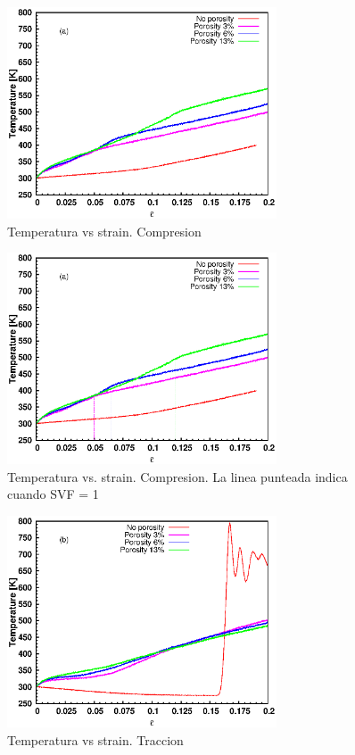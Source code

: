\documentclass[10pt, oneside]{article} %
\begin{document}

\begin{figure}[H]
\centering
\includegraphics[width=8cm]{Figures/Porosidad/porosity_temp_strain_comp.eps}
\caption{Temperatura vs strain. Compresion}
\end{figure}

\begin{figure}[H]
\centering
\includegraphics[width=8cm]{Figures/Porosidad/porosity_temp_strain_comp_dash.eps}
\caption{Temperatura vs. strain. Compresion. La linea punteada indica cuando SVF = 1}
\end{figure}

\begin{figure}[H]
\centering
\includegraphics[width=8cm]{Figures/Porosidad/porosity_temp_strain_tens.eps}
\caption{Temperatura vs strain. Traccion}
\end{figure}
\end{document}

